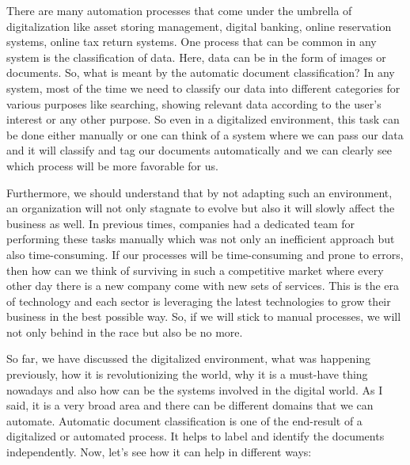 \newline
\par
There are many automation processes that come under the umbrella of digitalization like asset storing management, digital banking, online reservation systems, online tax return systems. One process that can be common in any system is the classification of data. Here, data can be in the form of images or documents. So, what is meant by the automatic document classification? In any system, most of the time we need to classify our data into different categories for various purposes like searching, showing relevant data according to the user's interest or any other purpose. So even in a digitalized environment, this task can be done either manually or one can think of a system where we can pass our data and it will classify and tag our documents automatically and we can clearly see which process will be more favorable for us.
\newline
\par
Furthermore, we should understand that by not adapting such an environment, an organization will not only stagnate to evolve but also it will slowly affect the business as well. In previous times, companies had a dedicated team for performing these tasks manually which was not only an inefficient approach but also time-consuming. If our processes will be time-consuming and prone to errors, then how can we think of surviving in such a competitive market where every other day there is a new company come with new sets of services. This is the era of technology and each sector is leveraging the latest technologies to grow their business in the best possible way. So, if we will stick to manual processes, we will not only behind in the race but also be no more.
\newline
\par
So far, we have discussed the digitalized environment, what was happening previously, how it is revolutionizing the world, why it is a must-have thing nowadays and also how can be the systems involved in the digital world. As I said, it is a very broad area and there can be different domains that we can automate. Automatic document classification is one of the end-result of a digitalized or automated process. It helps to label and identify the documents independently. Now, let's see how it can help in different ways:
